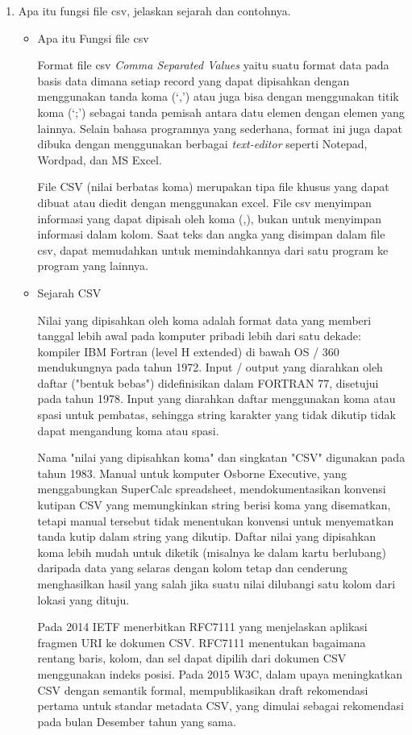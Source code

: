 \begin{enumerate}
 \item Apa itu fungsi file csv, jelaskan sejarah dan contohnya.
   \begin{itemize}
    \item Apa itu Fungsi file csv

     Format file csv \textit{Comma Separated Values} yaitu suatu format data pada basis data dimana setiap record yang dapat dipisahkan dengan menggunakan tanda koma (`,’) atau juga bisa dengan menggunakan titik koma (`;’) sebagai tanda pemisah antara datu elemen dengan elemen yang lainnya. Selain bahasa programnya yang sederhana, format ini juga dapat dibuka dengan menggunakan berbagai \textit{text-editor} seperti Notepad, Wordpad, dan MS Excel.

     File CSV (nilai berbatas koma) merupakan tipa file khusus yang dapat dibuat atau diedit dengan menggunakan excel. File csv menyimpan informasi yang dapat dipisah oleh koma (,), bukan untuk menyimpan informasi dalam kolom. Saat teks dan angka yang disimpan dalam file csv, dapat memudahkan untuk memindahkannya dari satu program ke program yang lainnya.

    \item Sejarah CSV

     Nilai yang dipisahkan oleh koma adalah format data yang memberi tanggal lebih awal pada komputer pribadi lebih dari satu dekade: kompiler IBM Fortran (level H extended) di bawah OS / 360 mendukungnya pada tahun 1972. Input / output yang diarahkan oleh daftar ("bentuk bebas") didefinisikan dalam FORTRAN 77, disetujui pada tahun 1978. Input yang diarahkan daftar menggunakan koma atau spasi untuk pembatas, sehingga string karakter yang tidak dikutip tidak dapat mengandung koma atau spasi.

     Nama "nilai yang dipisahkan koma" dan singkatan "CSV" digunakan pada tahun 1983. Manual untuk komputer Osborne Executive, yang menggabungkan SuperCalc spreadsheet, mendokumentasikan konvensi kutipan CSV yang memungkinkan string berisi koma yang disematkan, tetapi manual tersebut tidak menentukan konvensi untuk menyematkan tanda kutip dalam string yang dikutip. Daftar nilai yang dipisahkan koma lebih mudah untuk diketik (misalnya ke dalam kartu berlubang) daripada data yang selaras dengan kolom tetap dan cenderung menghasilkan hasil yang salah jika suatu nilai dilubangi satu kolom dari lokasi yang dituju.

     Pada 2014 IETF menerbitkan RFC7111 yang menjelaskan aplikasi fragmen URI ke dokumen CSV. RFC7111 menentukan bagaimana rentang baris, kolom, dan sel dapat dipilih dari dokumen CSV menggunakan indeks posisi. Pada 2015 W3C, dalam upaya meningkatkan CSV dengan semantik formal, mempublikasikan draft rekomendasi pertama untuk standar metadata CSV, yang dimulai sebagai rekomendasi pada bulan Desember tahun yang sama.


\end{itemize}
\end{enumerate}
